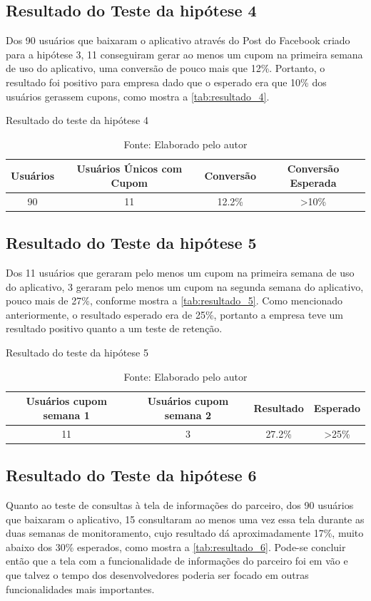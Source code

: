 \subsection{Resultado do Teste da hipótese 4}
\label{cha:resultado_4}
Dos 90 usuários que baixaram o aplicativo através do Post do Facebook criado para a hipótese 3, 11 conseguiram gerar ao menos um cupom na primeira semana de uso do aplicativo, uma conversão de pouco mais que 12\%. Portanto, o resultado foi positivo para empresa dado que o esperado era que 10\% dos usuários gerassem cupons, como mostra a \autoref{tab:resultado_4}.
\begin{table}[H]
\centering
\caption{Resultado do teste da hipótese 4}
\label{tab:resultado_4}
\begin{tabular}{|c|c|c|c|}
\hline
Usuários & Usuários Únicos com Cupom & Conversão & Conversão Esperada \\ \hline
90       & 11  & 12.2\%   & \textgreater 10\% \\ \hline
\end{tabular}
\caption* {Fonte: Elaborado pelo autor}    
\end{table}

\subsection{Resultado do Teste da hipótese 5}
\label{cha:resultado_5}
Dos 11 usuários que geraram pelo menos um cupom na primeira semana de uso do aplicativo, 3 geraram pelo menos um cupom na segunda semana do aplicativo, pouco mais de 27\%, conforme mostra a \autoref{tab:resultado_5}. Como mencionado anteriormente, o resultado esperado era de 25\%, portanto a empresa teve um resultado positivo quanto a um teste de retenção.
\begin{table}[H]
\centering
\caption{Resultado do teste da hipótese 5}
\label{tab:resultado_5}
\begin{tabular}{|c|c|c|c|}
\hline
Usuários cupom semana 1 & Usuários cupom semana 2 & Resultado & Esperado \\ \hline
11       & 3  & 27.2\%   & \textgreater 25\% \\ \hline
\end{tabular}
\caption* {Fonte: Elaborado pelo autor}    
\end{table}

\subsection{Resultado do Teste da hipótese 6}
\label{cha:resultado_6}
Quanto ao teste de consultas à tela de informações do parceiro, dos 90 usuários que baixaram o aplicativo, 15 consultaram ao menos uma vez essa tela durante as duas semanas de monitoramento, cujo resultado dá aproximadamente 17\%, muito abaixo dos 30\% esperados, como mostra a \autoref{tab:resultado_6}. Pode-se concluir então que a tela com a funcionalidade de informações do parceiro foi em vão e que talvez o tempo dos desenvolvedores poderia ser focado em outras funcionalidades mais importantes. 

